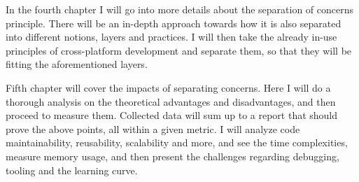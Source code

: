 \par
In the fourth chapter I will go into more details about the separation of concerns principle.
There will be an in-depth approach towards how it is also separated into different notions, layers and practices.
I will then take the already in-use principles of cross-platform development and separate them, so that they will be fitting the aforementioned layers.

\par
Fifth chapter will cover the impacts of separating concerns.
Here I will do a thorough analysis on the theoretical advantages and disadvantages, and then proceed to measure them.
Collected data will sum up to a report that should prove the above points, all within a given metric.
I will analyze code maintainability, reusability, scalability and more, and see the time complexities, measure memory usage, and then present the challenges regarding debugging, tooling and the learning curve.
